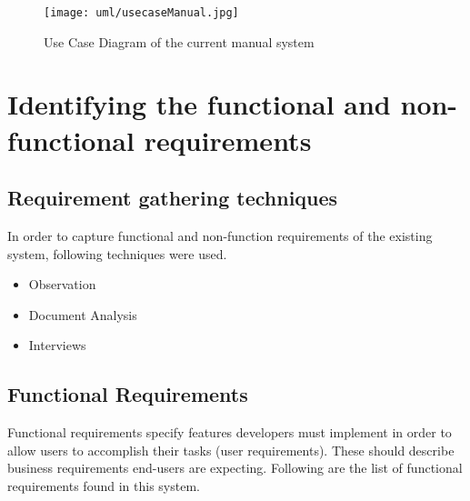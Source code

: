 \documentclass[12pt]{report}
\begin{document}
\begin{figure}[H]
	\centering
	\texttt{[image: uml/usecaseManual.jpg]}
	\caption{Use Case Diagram of the current manual system}
\end{figure}

\section{Identifying the functional and non-functional requirements}

\subsection{Requirement gathering techniques}
In order to capture functional and non-function requirements of the existing system, following techniques were used.

\begin{itemize}
	\item Observation
	\item Document Analysis
	\item Interviews
\end{itemize}

\subsection{Functional Requirements}
Functional requirements specify features developers must implement in order to allow users to accomplish their tasks (user requirements).  These should describe business requirements end-users are expecting. Following are the list of functional requirements found in this system.
\end{document}
